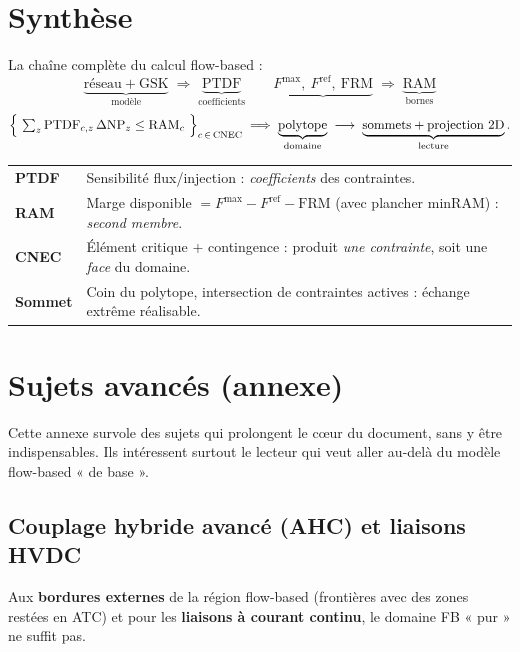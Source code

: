\documentclass[11pt,a4paper]{article}
\newcommand{\NP}{\mathrm{NP}}
\newcommand{\PTDF}{\mathrm{PTDF}}
\newcommand{\RAM}{\mathrm{RAM}}
\newcommand{\Fmax}{F^{\max}}
\newcommand{\Fref}{F^{\mathrm{ref}}}
\newcommand{\FRM}{\mathrm{FRM}}
\newcommand{\GSK}{\mathrm{GSK}}
\begin{document}
\section{Synthèse}

La chaîne complète du calcul flow-based :
\[
  \underbrace{\text{réseau} + \GSK}_{\text{modèle}}
  \;\Rightarrow\;
  \underbrace{\PTDF}_{\text{coefficients}}
  \qquad
  \underbrace{\Fmax,\ \Fref,\ \FRM}_{}
  \;\Rightarrow\;
  \underbrace{\RAM}_{\text{bornes}}
\]
\[
  \Bigl\{\ \textstyle\sum_z \PTDF_{c,z}\,\Delta\NP_z \le \RAM_c
  \ \Bigr\}_{c\,\in\,\text{CNEC}}
  \;\Longrightarrow\;
  \underbrace{\text{polytope}}_{\text{domaine}}
  \;\longrightarrow\;
  \underbrace{\text{sommets} + \text{projection 2D}}_{\text{lecture}} .
\]

\begin{center}
\begin{tabular}{@{}p{2.4cm}p{12.6cm}@{}}
\toprule
\textbf{PTDF} & Sensibilité flux/injection : \emph{coefficients} des
contraintes. \\
\textbf{RAM} & Marge disponible $=\Fmax-\Fref-\FRM$ (avec plancher minRAM) :
\emph{second membre}. \\
\textbf{CNEC} & Élément critique + contingence : produit \emph{une contrainte},
soit une \emph{face} du domaine. \\
\textbf{Sommet} & Coin du polytope, intersection de contraintes actives :
échange extrême réalisable. \\
\bottomrule
\end{tabular}
\end{center}

\appendix
\section{Sujets avancés (annexe)}
\label{sec:annexe}

Cette annexe survole des sujets qui prolongent le cœur du document, sans y être
indispensables. Ils intéressent surtout le lecteur qui veut aller au-delà du
modèle flow-based « de base ».

\subsection{Couplage hybride avancé (AHC) et liaisons HVDC}
\label{sec:ahc}

Aux \textbf{bordures externes} de la région flow-based (frontières avec des
zones restées en ATC) et pour les \textbf{liaisons à courant continu}, le
domaine FB « pur » ne suffit pas.
\end{document}

